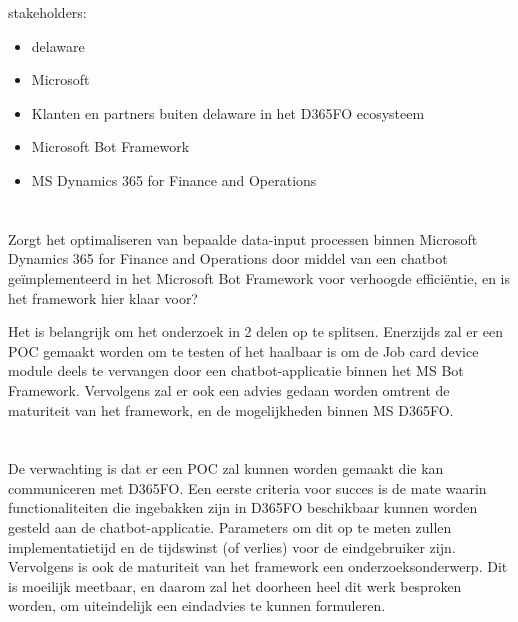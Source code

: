 stakeholders:
\begin{itemize}
    \item delaware
    \item Microsoft 
    \item Klanten en partners buiten delaware in het D365FO ecosysteem \item Microsoft Bot Framework
    \item MS Dynamics 365 for Finance and Operations
\end{itemize}

\section{}
\label{sec:onderzoeksvraag}
Zorgt het optimaliseren van bepaalde data-input processen binnen Microsoft Dynamics 365 for Finance and Operations door middel van een chatbot geïmplementeerd in het Microsoft Bot Framework voor verhoogde efficiëntie, en is het framework hier klaar voor? 


Het is belangrijk om het onderzoek in 2 delen op te splitsen. Enerzijds zal er een POC gemaakt worden om te testen of het haalbaar is om de Job card device module deels te vervangen door een chatbot-applicatie binnen het MS Bot Framework. Vervolgens zal er ook een advies gedaan worden omtrent de maturiteit van het framework, en de mogelijkheden binnen MS D365FO. 

\section{}
\label{sec:onderzoeksdoelstelling}

De verwachting is dat er een POC zal kunnen worden gemaakt die kan communiceren met D365FO. Een eerste criteria voor succes is de mate waarin functionaliteiten die ingebakken zijn in D365FO beschikbaar kunnen worden gesteld aan de chatbot-applicatie. Parameters om dit op te meten zullen implementatietijd en de tijdswinst (of verlies) voor de eindgebruiker zijn. Vervolgens is ook de maturiteit van het framework een onderzoeksonderwerp. Dit is moeilijk meetbaar, en daarom zal het doorheen heel dit werk besproken worden, om uiteindelijk een eindadvies te kunnen formuleren. 

